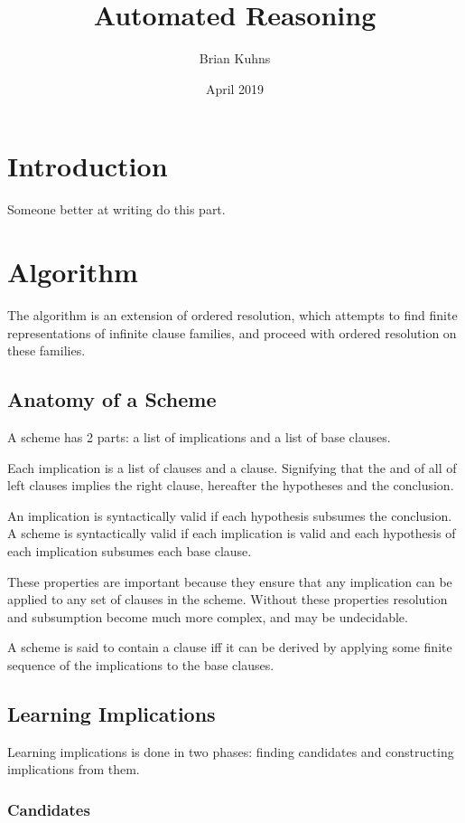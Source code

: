 \documentclass{article}
\title{Automated Reasoning}
\author{Brian Kuhns}
\date{April 2019}
\begin{document}
\maketitle

\section{Introduction}

  Someone better at writing do this part.

\section{Algorithm}

The algorithm is an extension of ordered resolution,
which attempts to find finite representations of infinite clause families,
and proceed with ordered resolution on these families.

\subsection{Anatomy of a Scheme}

A scheme has 2 parts:
a list of implications and a list of base clauses.

Each implication is a list of clauses and a clause.
Signifying that the and of all of left clauses implies the right clause,
hereafter the hypotheses and the conclusion.

An implication is syntactically valid if each hypothesis subsumes the conclusion.
A scheme is syntactically valid if each implication is valid and
each hypothesis of each implication subsumes each base clause.

These properties are important because they ensure that any implication can be applied to any set of clauses in the scheme.
Without these properties resolution and subsumption become much more complex, and may be undecidable.

A scheme is said to contain a clause iff it can be derived by applying some finite sequence of the 
implications to the base clauses.

\subsection{Learning Implications}

Learning implications is done in two phases: finding candidates and constructing implications from them.
 
\subsubsection{Candidates}
\end{document}
